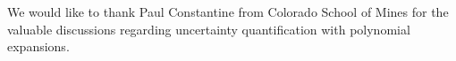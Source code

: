 We would like to thank Paul Constantine from Colorado School of Mines for the valuable discussions regarding uncertainty quantification with polynomial expansions.
